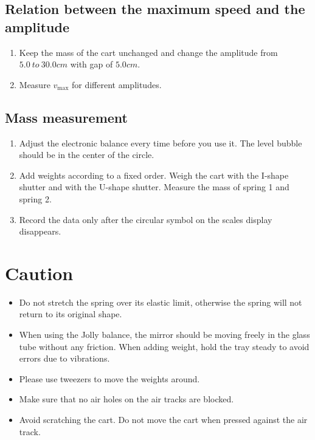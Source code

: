 \subsection{Relation between the maximum speed and the amplitude}

\begin{enumerate}
\item Keep the mass of the cart unchanged and change the amplitude from $5.0\
  to\ 30.0 cm$ with gap of $5.0cm$. 
\item Measure $v_{\max}$ for different amplitudes.
\end{enumerate}

\subsection{Mass measurement}

\begin{enumerate}
\item Adjust the electronic balance every time before you use it. The level
  bubble should be in the center of the circle. 
\item Add weights according to a fixed order. Weigh the cart with the I-shape
  shutter and with the U-shape shutter. Measure the mass of spring 1 and spring
  2. 
\item Record the data only after the circular symbol on the scales display
  disappears. 
\end{enumerate}


\section{Caution}

\begin{itemize}
\item Do not stretch the spring over its elastic limit, otherwise the spring
  will not return to its original shape.  
\item When using the Jolly balance, the mirror should be moving freely in the
  glass tube without any friction. When adding weight, hold the tray steady to
  avoid errors due to vibrations. 
\item Please use tweezers to move the weights around.
\item  Make sure that no air holes on the air tracks are blocked.
\item Avoid scratching the cart. Do not move the cart when pressed against the
  air track.
\end{itemize}
